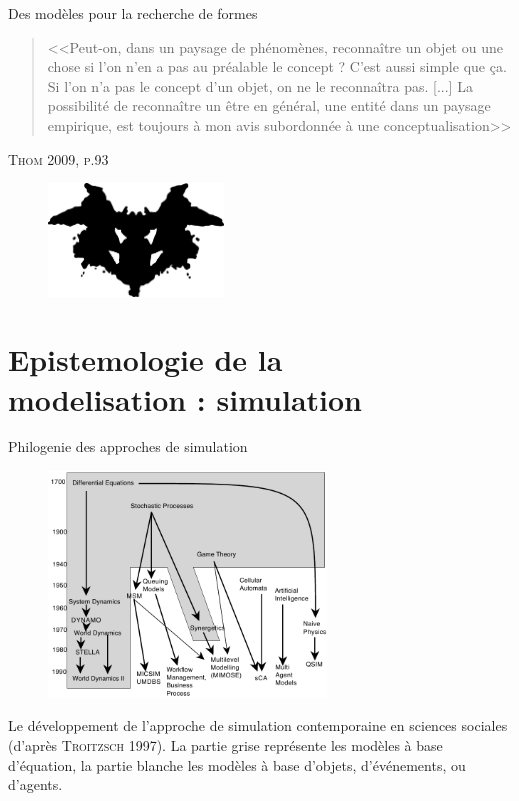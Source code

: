 \documentclass[newPxFont]{beamer}
\begin{document}
\begin{frame}[c]{Des modèles pour la recherche de formes}
  \vspace{-1em}
  \begin{quote}
    <<Peut-on, dans un paysage de phénomènes, reconnaître un objet ou une chose si l'on n'en a pas au préalable le concept ? C'est aussi simple que ça. Si l'on n'a pas le concept d'un objet, on ne le reconnaîtra pas. [...] La possibilité de reconnaître un être en général, une entité dans un paysage empirique, est toujours à mon avis subordonnée à une conceptualisation>>
  \end{quote}
  \hspace*{\fill}\textsc{Thom 2009, p.93}
  \vspace{-0.5em}
  \begin{figure}
   \includegraphics[height=3cm]{img/a_rorschach.png}
  \end{figure}
\end{frame}

\section{Epistemologie de la\\ modelisation : simulation}


\begin{frame}[c]{Philogenie des approches de simulation}
  \vspace{-2em}
  \begin{figure}
   \includegraphics[height=6cm]{img/a_troitzsch_1997.png}
  \end{figure}
  \vspace{-0.8em}
  \small{Le développement de l'approche de simulation contemporaine en sciences sociales (d'après \textsc{Troitzsch} 1997). La partie grise représente les modèles à base d'équation, la partie blanche les modèles à base d'objets, d'événements, ou d'agents}.
\end{frame}
\end{document}
